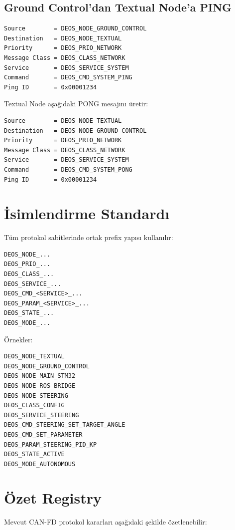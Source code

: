 \documentclass[a4paper,10pt]{article}
\begin{document}
\subsection{Ground Control'dan Textual Node'a PING}

\begin{verbatim}
Source        = DEOS_NODE_GROUND_CONTROL
Destination   = DEOS_NODE_TEXTUAL
Priority      = DEOS_PRIO_NETWORK
Message Class = DEOS_CLASS_NETWORK
Service       = DEOS_SERVICE_SYSTEM
Command       = DEOS_CMD_SYSTEM_PING
Ping ID       = 0x00001234
\end{verbatim}

Textual Node aşağıdaki PONG mesajını üretir:

\begin{verbatim}
Source        = DEOS_NODE_TEXTUAL
Destination   = DEOS_NODE_GROUND_CONTROL
Priority      = DEOS_PRIO_NETWORK
Message Class = DEOS_CLASS_NETWORK
Service       = DEOS_SERVICE_SYSTEM
Command       = DEOS_CMD_SYSTEM_PONG
Ping ID       = 0x00001234
\end{verbatim}


\section{İsimlendirme Standardı}

Tüm protokol sabitlerinde ortak prefix yapısı kullanılır:

\begin{verbatim}
DEOS_NODE_...
DEOS_PRIO_...
DEOS_CLASS_...
DEOS_SERVICE_...
DEOS_CMD_<SERVICE>_...
DEOS_PARAM_<SERVICE>_...
DEOS_STATE_...
DEOS_MODE_...
\end{verbatim}

Örnekler:

\begin{verbatim}
DEOS_NODE_TEXTUAL
DEOS_NODE_GROUND_CONTROL
DEOS_NODE_MAIN_STM32
DEOS_NODE_ROS_BRIDGE
DEOS_NODE_STEERING
DEOS_CLASS_CONFIG
DEOS_SERVICE_STEERING
DEOS_CMD_STEERING_SET_TARGET_ANGLE
DEOS_CMD_SET_PARAMETER
DEOS_PARAM_STEERING_PID_KP
DEOS_STATE_ACTIVE
DEOS_MODE_AUTONOMOUS
\end{verbatim}


\section{Özet Registry}

Mevcut CAN-FD protokol kararları aşağıdaki şekilde özetlenebilir:
\end{document}

